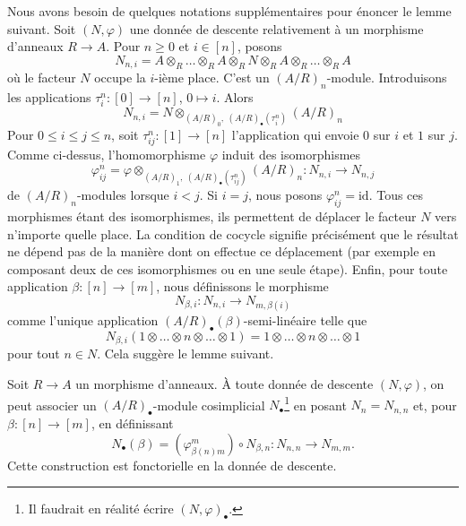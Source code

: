 \medskip\noindent
Nous avons besoin de quelques notations supplémentaires pour énoncer le lemme
suivant. Soit $(N, \varphi)$ une donnée de descente relativement à un
morphisme d'anneaux $R \to A$. Pour $n \geq 0$ et $i \in [n]$, posons
$$
N_{n, i} =
A \otimes_R
\ldots
\otimes_R A \otimes_R N \otimes_R A \otimes_R
\ldots
\otimes_R A
$$
où le facteur $N$ occupe la $i$-ième place. C'est un $(A/R)_n$-module.
Introduisons les applications $\tau^n_i : [0] \to [n]$, $0 \mapsto i$.
Alors
$$
N_{n, i} = N \otimes_{(A/R)_0, \ (A/R)_\bullet(\tau^n_i)} (A/R)_n
$$
Pour $0 \leq i \leq j \leq n$, soit
$\tau^n_{ij} : [1] \to [n]$ l'application qui envoie $0$ sur $i$ et $1$ sur
$j$. Comme ci-dessus, l'homomorphisme $\varphi$ induit des isomorphismes
$$
\varphi^n_{ij}
=
\varphi \otimes_{(A/R)_1, \ (A/R)_\bullet(\tau^n_{ij})} (A/R)_n :
N_{n, i} \longrightarrow N_{n, j}
$$
de $(A/R)_n$-modules lorsque $i < j$. Si $i = j$, nous posons
$\varphi^n_{ij} = \text{id}$. Tous ces morphismes étant des isomorphismes, ils
permettent de déplacer le facteur $N$ vers n'importe quelle place. La
condition de cocycle signifie précisément que le résultat ne dépend pas de la
manière dont on effectue ce déplacement (par exemple en composant deux de ces
isomorphismes ou en une seule étape). Enfin, pour toute application
$\beta : [n] \to [m]$, nous définissons le morphisme
$$
N_{\beta, i} : N_{n, i} \to N_{m, \beta(i)}
$$
comme l'unique application $(A/R)_\bullet(\beta)$-semi-linéaire telle que
$$
N_{\beta, i}(1 \otimes \ldots \otimes n \otimes \ldots \otimes 1)
=
1 \otimes \ldots \otimes n \otimes \ldots \otimes 1
$$
pour tout $n \in N$. Cela suggère le lemme suivant.

\begin{lemma}
\label{lemma-descent-datum-cosimplicial}
Soit $R \to A$ un morphisme d'anneaux. À toute donnée de descente
$(N, \varphi)$, on peut associer un $(A/R)_\bullet$-module cosimplicial
$N_\bullet$\footnote{Il faudrait en réalité écrire
$(N, \varphi)_\bullet$.} en posant $N_n = N_{n, n}$ et, pour
$\beta : [n] \to [m]$, en définissant
$$
N_\bullet(\beta) = (\varphi^m_{\beta(n)m}) \circ N_{\beta, n} :
N_{n, n} \longrightarrow N_{m, m}.
$$
Cette construction est fonctorielle en la donnée de descente.
\end{lemma}

